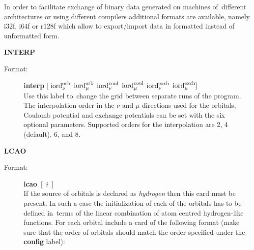 \documentclass[12pt,a4paper]{article}
\begin{document}
\begin{description}
\begin{description}
  In order to facilitate exchange of binary data generated on machines of~different
  architectures or using different compilers additional formats are available, namely
  i32f, i64f or r128f which allow to export/import data in formatted instead of
  unformatted form.
\end{description}


\item \textbf{INTERP}
\begin{description}
\item[Format:] \textbf{interp} $[\; {\rm iord}_\nu^{\rm orb}$ ${\rm
    iord}_\mu^{\rm orb}$ ${\rm iord}_\nu^{\rm coul}$ ${\rm
    iord}_\mu^{\rm coul}$ ${\rm iord}_\nu^{\rm exch}$ ${\rm
    iord}_\mu^{\rm exch} ]$\\ Use this label to~change the grid
  between separate runs of the program. The interpolation order in the
  $\nu$ and $\mu$ directions used for the orbitals, Coulomb potential
  and exchange potentials can be set with the six optional
  parameters. Supported orders for the interpolation are 2, 4
  (default), 6, and 8.
\end{description}




\item \textbf{LCAO}
\begin{description}
\item[Format:] \textbf{lcao} $[\;i\;]$\\ If the source of orbitals is declared as
  \textsl{hydrogen} then this card must be present. In such a case the initialization of
  each of the orbitals has to be defined in~terms of the linear combination of atom
  centred hydrogen-like functions. For each orbital include a card of the following format
  (make sure that the order of orbitals should match the order specified under the
  \textbf{config} label):


\end{description}
\end{description}
\end{document}
